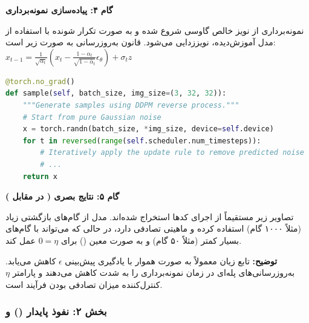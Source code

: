 \textbf{گام ۴: پیاده‌سازی نمونه‌برداری}
\begin{solutionbox}
    نمونه‌برداری  از نویز خالص گاوسی شروع شده و به صورت تکرار شونده با استفاده از مدل آموزش‌دیده، نویززدایی می‌شود. قانون به‌روزرسانی به صورت زیر است:
    $x_{t-1} = \frac{1}{\sqrt{\alpha_t}}(x_t - \frac{1-\alpha_t}{\sqrt{1-\bar{\alpha}_t}}\epsilon_\theta) + \sigma_t z$



\begin{latin}
\begin{lstlisting}[language=Python]
@torch.no_grad()
def sample(self, batch_size, img_size=(3, 32, 32)):
    """Generate samples using DDPM reverse process."""
    # Start from pure Gaussian noise
    x = torch.randn(batch_size, *img_size, device=self.device)
    for t in reversed(range(self.scheduler.num_timesteps)):
        # Iteratively apply the update rule to remove predicted noise
        # ...
    return x
\end{lstlisting}
\end{latin}
\end{solutionbox}

\textbf{گام ۵: نتایج بصری ( در مقابل )}
\begin{solutionbox}
    تصاویر زیر مستقیماً از اجرای کدها استخراج شده‌اند. مدل  از گام‌های بازگشتی زیاد (مثلاً ۱۰۰۰ گام) استفاده کرده و ماهیتی تصادفی دارد، در حالی که  می‌تواند با گام‌های بسیار کمتر (مثلاً ۵۰ گام) و به صورت معین () برای $0=\eta$ عمل کند.

    

    \textbf{توضیح:} تابع زیان  معمولاً به صورت هموار با یادگیری پیش‌بینی $\epsilon$ کاهش می‌یابد. به‌روزرسانی‌های پله‌ای در  زمان نمونه‌برداری را به شدت کاهش می‌دهند و پارامتر $\eta$ کنترل‌کننده میزان تصادفی بودن فرآیند است.
\end{solutionbox}

\newpage

\subsubsection{بخش ۲: نفوذ پایدار () و }

